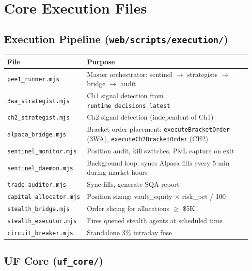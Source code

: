 \documentclass[11pt, a4paper]{article}
\begin{document}
\section{Core Execution Files}

\subsection{Execution Pipeline (\texttt{web/scripts/execution/})}

\begin{longtable}{@{}p{5.5cm}p{9cm}@{}}
\toprule
\textbf{File} & \textbf{Purpose} \\
\midrule
\endhead
\texttt{pee1\_runner.mjs} & Master orchestrator: sentinel $\to$ strategists $\to$ bridge $\to$ audit \\
\texttt{3wa\_strategist.mjs} & Ch1 signal detection from \texttt{runtime\_decisions\_latest} \\
\texttt{ch2\_strategist.mjs} & Ch2 signal detection (independent of Ch1) \\
\texttt{alpaca\_bridge.mjs} & Bracket order placement: \texttt{executeBracketOrder} (3WA), \texttt{executeCh2BracketOrder} (CH2) \\
\texttt{sentinel\_monitor.mjs} & Position audit, kill switches, P\&L capture on exit \\
\texttt{sentinel\_daemon.mjs} & Background loop: syncs Alpaca fills every 5 min during market hours \\
\texttt{trade\_auditor.mjs} & Sync fills, generate SQA report \\
\texttt{capital\_allocator.mjs} & Position sizing: vault\_equity $\times$ risk\_pct / 100 \\
\texttt{stealth\_bridge.mjs} & Order slicing for allocations $\geq$ \$5K \\
\texttt{stealth\_executor.mjs} & Fires queued stealth agents at scheduled time \\
\texttt{circuit\_breaker.mjs} & Standalone 3\% intraday fuse \\
\bottomrule
\end{longtable}

\subsection{UF Core (\texttt{uf\_core/})}
\end{document}
